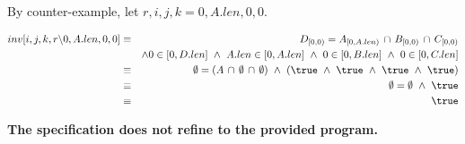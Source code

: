 \documentclass[a4paper]{article}
\newcommand{\GUARD}{(i \neq A.len\, \lor\, j \neq B.len\, \lor\, k \neq C.len)}
\newcommand{\ASSIGNMENT}{i, j, k, r := 0, 0, 0, 0}
\newcommand{\ENV}{i, j, k, r, D}
\newcommand{\INTERSECTION}[4]{D_{[0, {#1})} = A_{[0, {#2})}\, \cap\, B_{[0, {#3})}\, \cap\, C_{[0, {#4})}}
\newcommand{\BOUNDED}[4]{{#1} \in [0, D.len] ~\land~ {#2} \in [0, A.len] ~\land~ {#3} \in [0, B.len] ~\land~ {#4} \in [0, C.len]}
\newcommand{\BOUNDEDNONINCLUSIVE}[3]{{#1} \in [0, A.len) ~\land~ {#2} \in [0, B.len) ~\land~ {#3} \in [0, C.len)}
\newcommand{\VARIANTEXP}{(0 \leqslant V < V_0)}
\newcommand{\IFCASE}[1]{{#1} \rightarrow \ENV:[{#1} \land inv \land guard,\, inv \land \VARIANTEXP]}
\begin{document}
By counter-example, let $r, i, j, k = 0, A.len, 0, 0$.

\begin{eqnarray*}
inv[i, j, k, r \backslash 0, A.len, 0, 0] & \equiv & \INTERSECTION{0}{A.len}{0}{0}\\
    && \land \BOUNDED{0}{A.len}{0}{0}\\
    & \equiv & \emptyset = (A\, \cap\, \emptyset\, \cap\, \emptyset) ~\land~ (\true ~\land~ \true ~\land~ \true ~\land~ \true)\\
    & \equiv & \emptyset = \emptyset ~\land~ \true\\
    & \equiv & \true
\end{eqnarray*} 




\textbf{The specification does not refine to the provided program.}





\end{document}
